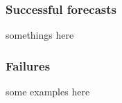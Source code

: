 \subsubsection{Successful forecasts}

somethings here

\subsubsection{Failures}

some examples here
